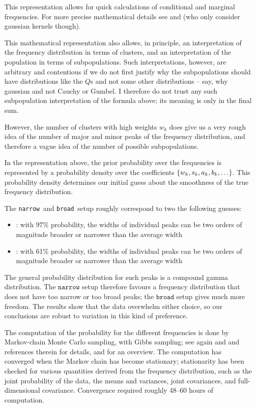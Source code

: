 \documentclass[\ifafour a4paper,12pt,\else a5paper,10pt,\fi%
onecolumn,oneside,article,%
british%
]{memoir}
\theoremstyle{remark}
\theoremstyle{innote}
\DeclarePairedDelimiter\set{\{}{\}} %
\renewcommand*{\|}[1][]{\nonscript\:#1\vert\nonscript\:\mathopen{}}
\newcommand*{\chap}{ch.}%
\newcommand*{\narrow}{\texttt{narrow}}
\newcommand*{\broad}{\texttt{broad}}
\begin{document}
This representation allows for quick calculations of conditional and
marginal frequencies. For more precise mathematical details see
\textcite{dunsonetal2011} and \textcite{rasmussen1999} (who only consider
gaussian kernels though).

This mathematical representation also allows, in principle, an
interpretation of the frequency distribution in terms of clusters, and an
interpretation of the population in terms of subpopulations. Such
interpretations, however, are arbitrary and contentious if we do not first
justify why the subpopulations should have distributions like the $Q$s and
not some other distributions -- say, why gaussian and not Cauchy or Gumbel.
I therefore do not trust any such subpopulation interpretation of the
formula above; its meaning is only in the final sum.

However, the number of clusters with high weights $w_{k}$ does give us a
very rough idea of the number of major and minor peaks of the frequency
distribution, and therefore a vague idea of the number of possible
subpopulations.

In the representation above, the prior probability over the frequencies is
represented by a probability density over the coefficients
$\set{w_{k},s_{k},a_{k},b_{k},\dotsc}$. This probability density determines
our initial guess about the smoothness of the true frequency
distribution.

The \narrow\ and \broad\ setup roughly correspond to two the following
guesses:
\begin{itemize}[wide]
\item[\narrow]\!: with 97\% probability, the widths of individual peaks can
  be two orders of magnitude broader or narrower than the average width
\item[\broad]\!: with 61\% probability, the widths of individual peaks can
  be two orders of magnitude broader or narrower than the average width
\end{itemize}
The general probability distribution for such peaks is a compound gamma
distribution. The $\narrow$ setup therefore favours a frequency
distribution that does not have too narrow or too broad peaks; the $\broad$
setup gives much more freedom. The results show that the data overwhelm
either choice, so our conclusions are robust to variation in this kind of
preference.

\bigskip

The computation of the probability for the different frequencies is done by
Markov-chain Monte Carlo sampling, with Gibbs sampling; see again
\textcite{dunsonetal2011} and \textcite{rasmussen1999} and references
therein for details, and \textcite[\chap~29]{mackay1995_r2005} for an
overview. The computation has converged when the Markov chain has become
stationary; stationarity has been checked for various quantities derived
from the frequency distribution, such as the joint probability of the data,
the means and variances, joint covariances, and full-dimensional
covariance. Convergence required roughly 48--60 hours of computation.
\end{document}
